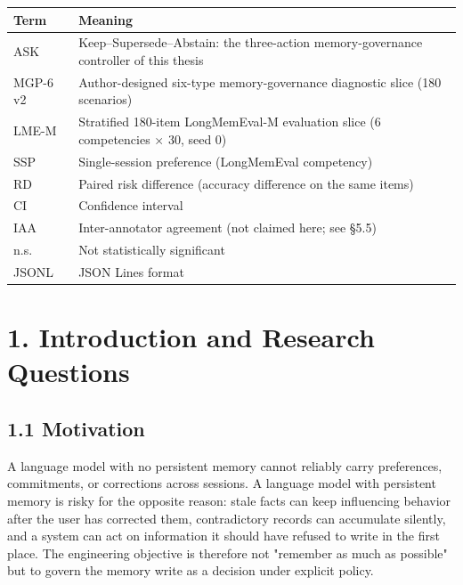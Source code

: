 {\def\LTcaptype{none} %
\begin{longtable}[]{@{}
  >{\raggedright\arraybackslash}p{}
  >{\raggedright\arraybackslash}p{}@{}}
\toprule\noalign{}
\begin{minipage}[b]{\linewidth}\raggedright
\textbf{Term}
\end{minipage} & \begin{minipage}[b]{\linewidth}\centering
\textbf{Meaning}
\end{minipage} \\
\midrule\noalign{}
\endhead
\bottomrule\noalign{}
\endlastfoot
ASK & Keep--Supersede--Abstain: the three-action memory-governance
controller of this thesis \\
MGP-6 v2 & Author-designed six-type memory-governance diagnostic slice
(180 scenarios) \\
LME-M & Stratified 180-item LongMemEval-M evaluation slice (6
competencies × 30, seed 0) \\
SSP & Single-session preference (LongMemEval competency) \\
RD & Paired risk difference (accuracy difference on the same items) \\
CI & Confidence interval \\
IAA & Inter-annotator agreement (not claimed here; see §5.5) \\
n.s. & Not statistically significant \\
JSONL & JSON Lines format \\
\end{longtable}
}

\section{1. Introduction and Research
Questions}\label{introduction-and-research-questions}

\subsection{1.1 Motivation}\label{motivation}

A language model with no persistent memory cannot reliably carry
preferences, commitments, or corrections across sessions. A language
model with persistent memory is risky for the opposite reason: stale
facts can keep influencing behavior after the user has corrected them,
contradictory records can accumulate silently, and a system can act on
information it should have refused to write in the first place. The
engineering objective is therefore not "remember as much as possible"
but to govern the memory write as a decision under explicit policy.

